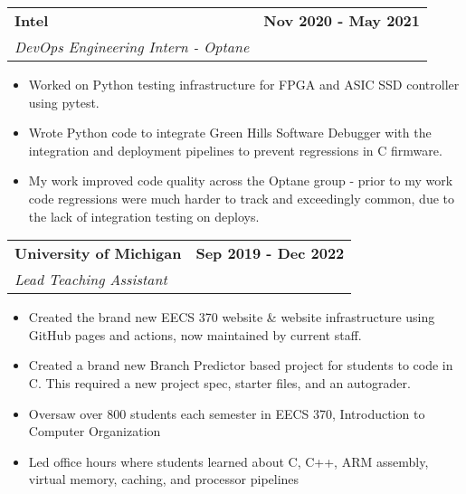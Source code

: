 \documentclass[10pt]{extreport}
\makeatletter
\newcommand{\resumeSubheading}[4]{
  \vspace{-1pt}
    \begin{tabular*}{1.0\textwidth}{l@{\extracolsep{\fill}}r}
      \textbf{#1} & \textbf{#2}  \vspace{1mm} \\
      {#3} & \textbf{#4} \\
    \end{tabular*}\vspace{-3pt}
}
\makeatother
\begin{document}
    \resumeSubheading{Intel}{Nov 2020 - May 2021}
    {\textit{DevOps Engineering Intern - Optane}}{}
    \vspace{-2mm}
    \begin{itemize}
    \item[\textperiodcentered] Worked on Python testing infrastructure for FPGA and ASIC SSD controller using pytest.
            \vspace{-2mm}

    \item[\textperiodcentered] Wrote Python code to integrate Green Hills Software Debugger with the integration and deployment pipelines to prevent regressions in C firmware. 
            \vspace{-2mm}

    \item[\textperiodcentered] My work 
 improved code quality across the Optane group - prior to my work code regressions were much harder to track and exceedingly common, due to the lack of integration testing on deploys.
    \end{itemize}
    
    \resumeSubheading{University of Michigan}{Sep 2019 - Dec 2022}
    {\textit{Lead Teaching Assistant}}{}
        \vspace{-2mm}
    \begin{itemize}
    \item[\textperiodcentered] Created the brand new EECS 370 website \& website infrastructure using GitHub pages and actions, now maintained by current staff.
        \vspace{-2mm}
    \item[\textperiodcentered] Created a brand new Branch Predictor based project for students to code in C. This required a new project spec, starter files, and an autograder.
        \vspace{-2mm}
    \item[\textperiodcentered] Oversaw over 800 students each semester in EECS 370, Introduction to Computer Organization
        \vspace{-2mm}
    \item[\textperiodcentered] Led office hours where students learned
    about C, C++, ARM assembly, virtual memory, caching, and processor pipelines
    \end{itemize}

\end{document}
